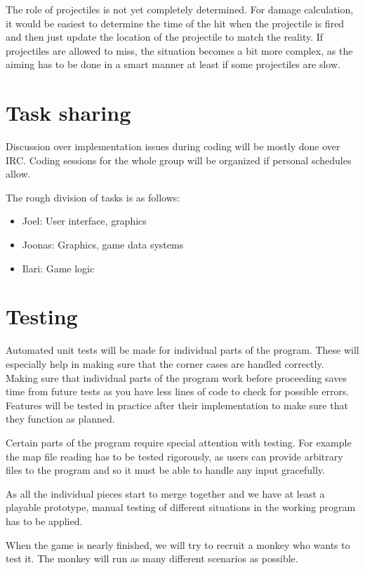 \documentclass[11pt]{article}
\begin{document}
  The role of projectiles is not yet completely determined. For damage
  calculation, it would be easiest to determine the time of the hit
  when the projectile is fired and then just update the location of
  the projectile to match the reality. If projectiles are allowed to
  miss, the situation becomes a bit more complex, as the aiming has to
  be done in a smart manner at least if some projectiles are slow.

\section{Task sharing}
\label{sec-4}

Discussion over implementation issues during coding will be mostly
done over IRC. Coding sessions for the whole group will be organized
if personal schedules allow.

The rough division of tasks is as follows:

\begin{itemize}
\item Joel: User interface, graphics
\item Joonas: Graphics, game data systems
\item Ilari: Game logic
\end{itemize}
\section{Testing}
\label{sec-5}

Automated unit tests will be made for individual parts of the
program. These will especially help in making sure that the corner
cases are handled correctly. Making sure that individual parts of the
program work before proceeding saves time from future tests as you
have less lines of code to check for possible errors. Features will be
tested in practice after their implementation to make sure that they
function as planned.

Certain parts of the program require special attention with testing.
For example the map file reading has to be tested rigorously, as users
can provide arbitrary files to the program and so it must be able to
handle any input gracefully.

As all the individual pieces start to merge together and we have at
least a playable prototype, manual testing of different situations in
the working program has to be applied.

When the game is nearly finished, we will try to recruit a monkey who
wants to test it. The monkey will run as many different scenarios as
possible.
\end{document}
